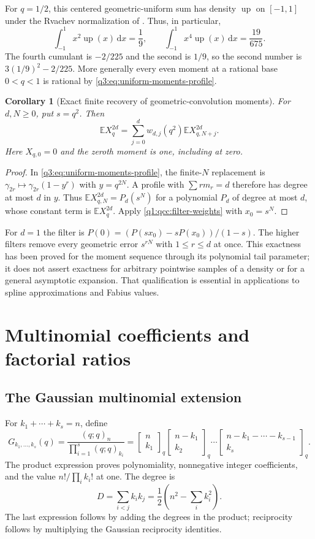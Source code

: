 \documentclass[11pt,a4paper,oneside,openany]{book}
\newtheorem{corollary}[theorem]{Corollary}
\theoremstyle{definition}
\theoremstyle{remark}
\newcommand{\GB}[3][q]{\begin{bmatrix}#2\\#3\end{bmatrix}_{#1}}
\newcommand{\dd}{\,\mathrm d}
\begin{document}
For $q=1/2$, this centered geometric-uniform sum has density
$\operatorname{up}$ on $[-1,1]$ under the Rvachev normalization of
\cite{proveit-primary}. Thus, in particular,
\begin{equation}
 \int_{-1}^1x^2\operatorname{up}(x)\dd x=\frac19,
 \qquad
 \int_{-1}^1x^4\operatorname{up}(x)\dd x=\frac{19}{675}.
 \label{q3:eq:up-moment-examples}
\end{equation}
The fourth cumulant is $-2/225$ and the second is $1/9$, so the second
number is $3(1/9)^2-2/225$. More generally every even moment at a
rational base $0<q<1$ is rational by
\cref{q3:eq:uniform-moments-profile}.
\begin{corollary}[Exact finite recovery of geometric-convolution moments]
For $d,N\ge0$, put $s=q^2$. Then
\begin{equation}
 \boxed{\displaystyle
 \mathbb E X_q^{2d}
       =\sum_{j=0}^d w_{d,j}(q^2)
                   \mathbb E X_{q,N+j}^{2d}.}
 \label{q3:eq:moment-extrapolation}
\end{equation}
Here $X_{q,0}=0$ and the zeroth moment is one, including at zero.
\end{corollary}
\begin{proof}
In \cref{q3:eq:uniform-moments-profile}, the finite-$N$ replacement is
$\gamma_{2r}\mapsto\gamma_{2r}(1-y^r)$ with $y=q^{2N}$.
A profile with $\sum rm_r=d$ therefore has degree at most $d$ in $y$.
Thus $\mathbb E X_{q,N}^{2d}=P_d(s^N)$ for a polynomial $P_d$ of
degree at most $d$, whose constant term is $\mathbb E X_q^{2d}$.
Apply \cref{q1:qcc:filter-weights} with $x_0=s^N$.
\end{proof}
For $d=1$ the filter is
$P(0)=(P(sx_0)-sP(x_0))/(1-s)$. The higher filters remove every
geometric error $s^{rN}$ with $1\le r\le d$ at once. This exactness
has been proved for the moment sequence through its polynomial tail
parameter; it does not assert exactness for arbitrary pointwise
samples of a density or for a general asymptotic expansion. That
qualification is essential in applications to spline approximations
and Fabius values.
\chapter{Multinomial coefficients and factorial ratios}
\label{q1:qcc:factorial-ratios}
\section{The Gaussian multinomial extension}
For \(k_1+\cdots+k_s=n\), define
\[
 G_{k_1,\ldots,k_s}(q)
  =\frac{(q;q)_n}{\prod_{i=1}^{s}(q;q)_{k_i}}
  =\GB n{k_1}\GB{n-k_1}{k_2}\cdots
                  \GB{n-k_1-\cdots-k_{s-1}}{k_s}.
\]
The product expression proves polynomiality, nonnegative integer coefficients,
and the value \(n!/\prod_i k_i!\) at one. The degree is
\[
 D=\sum_{i<j}k_ik_j=\frac12\left(n^2-\sum_i k_i^2\right).
\]
The last expression follows by adding the degrees in the product; reciprocity
follows by multiplying the Gaussian reciprocity identities.
\end{document}

